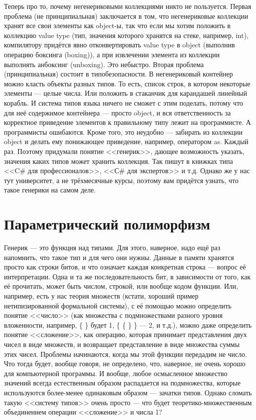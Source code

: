 \documentclass[a5paper]{article}
\begin{document}
Теперь про то, почему негенериковыми коллекциями никто не пользуется. Первая проблема (не принципиальная) заключается в том, что негенериковые коллекции хранят все свои элементы как object-ы, так что если мы хотим положить в коллекцию value type (тип, значения которого хранятся на стеке, например, int), компилятору придётся явно отконвертировать value type в object (выполнив операцию боксинга (boxing)), а при извлечении элемента из коллекции выполнять анбоксинг (unboxing). Это небыстро. Вторая проблема (принципиальная) состоит в типобезопасности. В негенериковый контейнер можно класть объекты разных типов. То есть, список строк, в котором некоторые элементы --- целые числа. Или положить в стаканчик для карандашей линейный корабль. И система типов языка ничего не сможет с этим поделать, потому что для неё содержимое контейнера --- просто object, и вся ответственность за корректное приведение элементов к правильному типу лежит на программисте. А программисты ошибаются. Кроме того, это неудобно --- забирать из коллекции object и делать ему понижающее приведение, например, оператором as. Каждый раз. Поэтому придумали понятие <<генерик>>, дающее возможность указать, значения каких типов может хранить коллекция. Так пишут в книжках типа <<C\# для профессионалов>>, <<С\# для экспертов>> и т.д. Однако же у нас тут университет, а не трёхмесячные курсы, поэтому вам придётся узнать, что такое генерики на самом деле.

\section{Параметрический полиморфизм}

Генерик --- это функция над типами. Для этого, наверное, надо ещё раз напомнить, что такое тип и для чего они нужны. Данные в памяти хранятся просто как строки битов, и что означает каждая конкретная строка --- вопрос её интерпретации. Одна и та же последовательность бит, в зависимости от того, как её прочитать, может быть числом, строкой, или вообще кодом функции. Или, например, есть у нас теория множеств (кстати, хороший пример нетипизированной формальной системы), с её помощью можно определить понятие <<число>> (как множества с подмножествами разного уровня вложенности, например, \{ \} будет 1, \{ \{ \} \} --- 2, и т.д.), можно даже определить понятие <<сложение>>, как операцию, которая принимает представления двух чисел в виде множеств, и возвращает  представление в виде множества суммы этих чисел. Проблемы начинаются, когда мы этой функции передадим не число. Что тогда будет, вообще говоря, не определено, что, наверное, не очень хорошо для компьютерной программы. И вообще, любое осмысленное множество значений всегда естественным образом распадается на подмножества, которые используются более-менее одинаковым образом --- зачатки типов. Однако сломать такую <<систему типов>> очень просто --- что будет теоретико-множественным объединением операции <<сложение>> и числа 1?
\end{document}
